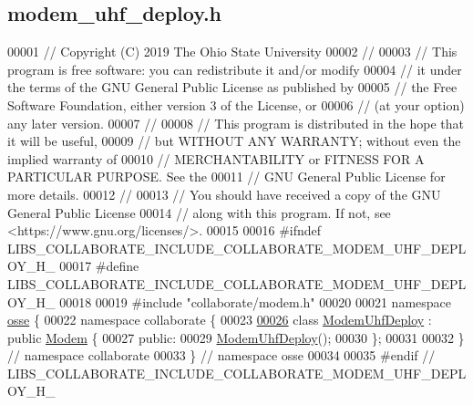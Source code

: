 \hypertarget{modem__uhf__deploy_8h_source}{}\subsection{modem\+\_\+uhf\+\_\+deploy.\+h}
\label{modem__uhf__deploy_8h_source}

\begin{DoxyCode}
00001 \textcolor{comment}{// Copyright (C) 2019 The Ohio State University}
00002 \textcolor{comment}{//}
00003 \textcolor{comment}{// This program is free software: you can redistribute it and/or modify}
00004 \textcolor{comment}{// it under the terms of the GNU General Public License as published by}
00005 \textcolor{comment}{// the Free Software Foundation, either version 3 of the License, or}
00006 \textcolor{comment}{// (at your option) any later version.}
00007 \textcolor{comment}{//}
00008 \textcolor{comment}{// This program is distributed in the hope that it will be useful,}
00009 \textcolor{comment}{// but WITHOUT ANY WARRANTY; without even the implied warranty of}
00010 \textcolor{comment}{// MERCHANTABILITY or FITNESS FOR A PARTICULAR PURPOSE.  See the}
00011 \textcolor{comment}{// GNU General Public License for more details.}
00012 \textcolor{comment}{//}
00013 \textcolor{comment}{// You should have received a copy of the GNU General Public License}
00014 \textcolor{comment}{// along with this program.  If not, see <https://www.gnu.org/licenses/>.}
00015 
00016 \textcolor{preprocessor}{#ifndef LIBS\_COLLABORATE\_INCLUDE\_COLLABORATE\_MODEM\_UHF\_DEPLOY\_H\_}
00017 \textcolor{preprocessor}{#define LIBS\_COLLABORATE\_INCLUDE\_COLLABORATE\_MODEM\_UHF\_DEPLOY\_H\_}
00018 
00019 \textcolor{preprocessor}{#include "collaborate/modem.h"}
00020 
00021 \textcolor{keyword}{namespace }\hyperlink{namespaceosse}{osse} \{
00022 \textcolor{keyword}{namespace }collaborate \{
00023 
\hyperlink{classosse_1_1collaborate_1_1_modem_uhf_deploy}{00026} \textcolor{keyword}{class }\hyperlink{classosse_1_1collaborate_1_1_modem_uhf_deploy}{ModemUhfDeploy} : \textcolor{keyword}{public} \hyperlink{classosse_1_1collaborate_1_1_modem}{Modem} \{
00027  \textcolor{keyword}{public}:
00029   \hyperlink{classosse_1_1collaborate_1_1_modem_uhf_deploy_a91e8e69f8a8cbaad00c874f24af2a0da}{ModemUhfDeploy}();
00030 \};
00031 
00032 \}  \textcolor{comment}{// namespace collaborate}
00033 \}  \textcolor{comment}{// namespace osse}
00034 
00035 \textcolor{preprocessor}{#endif  // LIBS\_COLLABORATE\_INCLUDE\_COLLABORATE\_MODEM\_UHF\_DEPLOY\_H\_}
\end{DoxyCode}
